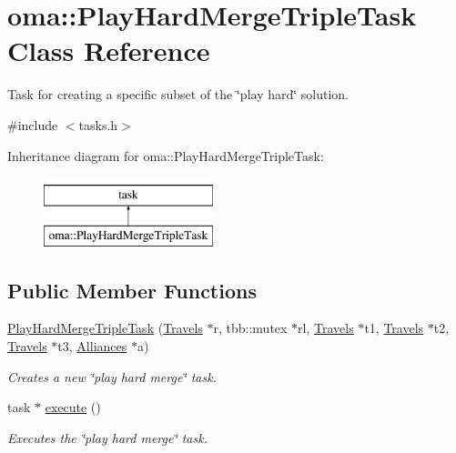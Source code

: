 \hypertarget{classoma_1_1_play_hard_merge_triple_task}{\section{oma\-:\-:Play\-Hard\-Merge\-Triple\-Task Class Reference}
\label{classoma_1_1_play_hard_merge_triple_task}
}


Task for creating a specific subset of the \char`\"{}play hard\char`\"{} solution.  




{\ttfamily \#include $<$tasks.\-h$>$}

Inheritance diagram for oma\-:\-:Play\-Hard\-Merge\-Triple\-Task\-:\begin{figure}[H]
\begin{center}
\leavevmode
\includegraphics[height=2.000000cm]{classoma_1_1_play_hard_merge_triple_task}
\end{center}
\end{figure}
\subsection*{Public Member Functions}
\begin{DoxyCompactItemize}
\item 
\hyperlink{classoma_1_1_play_hard_merge_triple_task_a97729e9e7ff12f386daa603e0e7a8031}{Play\-Hard\-Merge\-Triple\-Task} (\hyperlink{types_8h_aef021ba284c03a12dddcfa082468e831}{Travels} $\ast$r, tbb\-::mutex $\ast$rl, \hyperlink{types_8h_aef021ba284c03a12dddcfa082468e831}{Travels} $\ast$t1, \hyperlink{types_8h_aef021ba284c03a12dddcfa082468e831}{Travels} $\ast$t2, \hyperlink{types_8h_aef021ba284c03a12dddcfa082468e831}{Travels} $\ast$t3, \hyperlink{types_8h_a942cbcc40778424afe78605ae5c364c0}{Alliances} $\ast$a)
\begin{DoxyCompactList}\small\item\em Creates a new \char`\"{}play hard merge\char`\"{} task. \end{DoxyCompactList}\item 
task $\ast$ \hyperlink{classoma_1_1_play_hard_merge_triple_task_ac8ddaba33e85a0a468131a814ca51640}{execute} ()
\begin{DoxyCompactList}\small\item\em Executes the \char`\"{}play hard merge\char`\"{} task. \end{DoxyCompactList}\end{DoxyCompactItemize}


